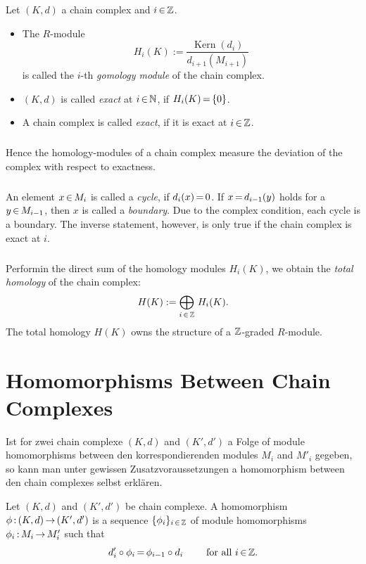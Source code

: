 \documentclass[11pt,twoside]{article}
\begin{document}
\begin{definition}
Let $(K,d)$ a chain complex and $i {\,\in\,} {\mathbb{Z}}$.

\begin{itemize}
\item
The $R$-module
\[
H_i(K) := \frac {\operatorname{Kern} (d_i)}
                {d_{i+1}(M_{i+1})}
\]
is called the $i$-th \textit{gomology module} of the chain complex.

\item
$(K,d)$ is called \textit{exact} at $i {\,\in\,} {\mathbb{N}}$,
if $H_i(K) {\,=\,} \{0\}$.

\item
A chain complex is called \textit{exact}, 
if it is exact at $i {\,\in\,} {\mathbb{Z}}$.
\end{itemize}
\end{definition}

\subparagraph{}
Hence the homology-modules of a chain complex measure the deviation of the complex
with respect to exactness.

\subparagraph{}
An element $x {\,\in\,} M_{i}$ is called a \textit{cycle}, if $d_i(x) {\,=\,} 0$.
If $x {\,=\,} d_{i-1}(y)$ holds for a $y {\,\in\,} M_{i-1}$,
then $x$ is called a \textit{boundary}.
Due to the complex condition, each cycle is a boundary.
The inverse statement,
however,
is only true
if the chain complex is exact at $i$.

\subparagraph{}
Performin the direct sum of the homology modules $H_i(K)$,
we obtain the \textit{total homology} of the chain complex:
\[
H(K) := \bigoplus_{i {\,\in\,} {\mathbb{Z}}} \, H_i(K).
\]
The total homology $H(K)$ owns the structure of a ${\mathbb{Z}}$-graded $R$-module.

\section{Homomorphisms Between Chain Complexes}
Ist for zwei chain complexe $(K,d)$ and $(K',d')$ a Folge of 
module homomorphisms between den korrespondierenden modules
$M_i$ and $M'_i$ gegeben,
so kann man unter gewissen Zusatzvoraussetzungen a 
homomorphism between den chain complexes selbst erklären.

\begin{definition}
Let $(K,d)$ and $(K',d')$ be chain complexe.
A homomorphism $\phi {\,:\,} (K,d) {\,\to\,} (K',d')$ is a sequence
$\{\phi_i\}_{i {\,\in\,} {\mathbb{Z}}}$ of module homomorphisms $\phi_i {\,:\,} M_i {\,\to\,} M'_i$
such that
\[
d'_i \circ \phi_i {\,=\,} \phi_{i-1} \circ d_i \qquad \mbox{ for all } i {\,\in\,} {\mathbb{Z}}.
\]
\end{definition}
\end{document}
